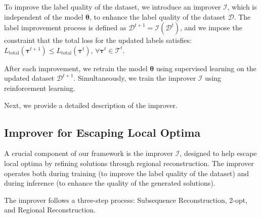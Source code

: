  
To improve the label quality of the dataset, we introduce an improver $\mathcal{I}$, which is independent of the model $\boldsymbol{\theta}$, 
to enhance the label quality of the dataset $\mathcal{D}$. 
The label improvement process is defined as $\mathcal{D}^{t+1} = \mathcal{I}(\mathcal{D}^t)$, and we impose the constraint that the total loss for the updated labels satisfies: 
$L_{\text{total}}(\boldsymbol{\tau}^{t+1}) \leq L_{\text{total}}(\boldsymbol{\tau}^{t})$, $\forall \boldsymbol{\tau}^{t} \in \boldsymbol{\mathcal{T}}^{t}$. 

After each improvement, we retrain the model $\boldsymbol{\theta}$ using supervised learning on the updated dataset $\mathcal{D}^{t+1}$.
Simultaneously, we train the improver $\mathcal{I}$ using reinforcement learning. 

Next, we provide a detailed description of the improver.

\subsection{Improver for Escaping Local Optima}
A crucial component of our framework is the improver $\mathcal{I}$, designed to help escape local optima by refining solutions through regional reconstruction. 
The improver operates both during training (to improve the label quality of the dataset) and during inference (to enhance the quality of the generated solutions). %

The improver follows a three-step process: Subsequence Reconstruction, 2-opt, and Regional Reconstruction.

